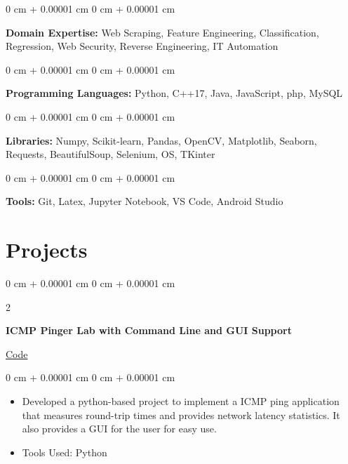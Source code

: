 \documentclass[10pt, letterpaper]{article}
\newenvironment{highlights}{
    \begin{itemize}[
        topsep=0.10 cm,
        parsep=0.10 cm,
        partopsep=0pt,
        itemsep=0pt,
        leftmargin=0 cm + 10pt
    ]
}{
    \end{itemize}
} %
\newenvironment{onecolentry}{
    \begin{adjustwidth}{
        0 cm + 0.00001 cm
    }{
        0 cm + 0.00001 cm
    }
}{
    \end{adjustwidth}
} %
\newenvironment{twocolentry}[2][]{
    \onecolentry
    \def\secondColumn{#2}
    \setcolumnwidth{\fill, 4.5 cm}
    \begin{paracol}{2}
}{
    \switchcolumn \raggedleft \secondColumn
    \end{paracol}
    \endonecolentry
} %
\begin{document}
        \begin{onecolentry}
            \textbf{Domain Expertise:} Web Scraping, Feature Engineering, Classification, Regression, Web Security, Reverse Engineering, IT Automation
        \end{onecolentry}

        \vspace{0.1 cm}
        
        \begin{onecolentry}
            \textbf{Programming Languages:} Python, C++17, Java, JavaScript, php, MySQL
        \end{onecolentry}

        \vspace{0.1 cm}
        
        \begin{onecolentry}
            \textbf{Libraries:} Numpy, Scikit-learn, Pandas, OpenCV, Matplotlib, Seaborn, Requests, BeautifulSoup, Selenium, OS, TKinter
        \end{onecolentry}
        
        \vspace{0.1 cm}
        
        \begin{onecolentry}
            \textbf{Tools:} Git, Latex, Jupyter Notebook, VS Code, Android Studio
        \end{onecolentry}

    \section{Projects}

        \begin{twocolentry}
            {\href{https://github.com/ItsTHEAvro/ICMP_Pinger_Lab}{Code}}
            \textbf{ICMP Pinger Lab with Command Line and GUI Support}
        \end{twocolentry}

        \vspace{0.10 cm}
        
        \begin{onecolentry}
            \begin{highlights}
                \item Developed a python-based project to implement a ICMP ping application that measures round-trip times and provides network latency statistics. It also provides a GUI for the user for easy use.
                \item Tools Used: Python
            \end{highlights}
        \end{onecolentry}
\end{document}
